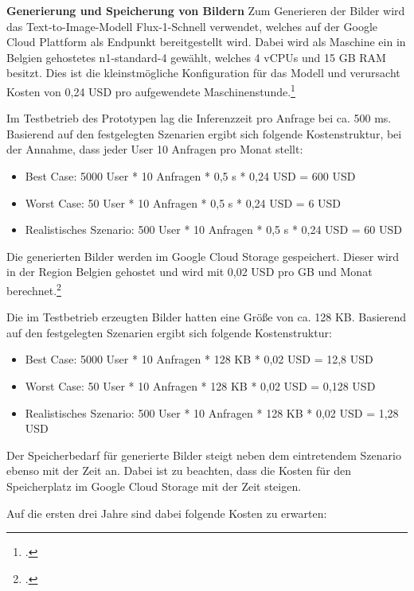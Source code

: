 \textbf{Generierung und Speicherung von Bildern}\newline
Zum Generieren der Bilder wird das Text-to-Image-Modell Flux-1-Schnell verwendet, welches auf der Google Cloud Plattform als Endpunkt bereitgestellt wird.
Dabei wird als Maschine ein in Belgien gehostetes n1-standard-4 gewählt, welches 4 vCPUs und 15 GB RAM besitzt.
Dies ist die kleinstmögliche Konfiguration für das Modell und verursacht Kosten von 0,24 USD pro aufgewendete Maschinenstunde.\footcite{GoogleVertexAI2025}

Im Testbetrieb des Prototypen lag die Inferenzzeit pro Anfrage bei ca. 500 ms.
Basierend auf den festgelegten Szenarien ergibt sich folgende Kostenstruktur, bei der Annahme, dass jeder User 10 Anfragen pro Monat stellt:

\begin{itemize}
    \item Best Case: 5000 User * 10 Anfragen * 0,5 s * 0,24 USD = 600 USD
    \item Worst Case: 50 User * 10 Anfragen * 0,5 s * 0,24 USD = 6 USD
    \item Realistisches Szenario: 500 User * 10 Anfragen * 0,5 s * 0,24 USD = 60 USD
\end{itemize}

Die generierten Bilder werden im Google Cloud Storage gespeichert.
Dieser wird in der Region Belgien gehostet und wird mit 0,02 USD pro GB und Monat berechnet.\footcite{GoogleCloudStorage2025}

Die im Testbetrieb erzeugten Bilder hatten eine Größe von ca. 128 KB.
Basierend auf den festgelegten Szenarien ergibt sich folgende Kostenstruktur:
\begin{itemize}
    \item Best Case: 5000 User * 10 Anfragen * 128 KB * 0,02 USD = 12,8 USD
    \item Worst Case: 50 User * 10 Anfragen * 128 KB * 0,02 USD = 0,128 USD
    \item Realistisches Szenario: 500 User * 10 Anfragen * 128 KB * 0,02 USD = 1,28 USD
\end{itemize}

Der Speicherbedarf für generierte Bilder steigt neben dem eintretendem Szenario ebenso mit der Zeit an.
Dabei ist zu beachten, dass die Kosten für den Speicherplatz im Google Cloud Storage mit der Zeit steigen.

Auf die ersten drei Jahre sind dabei folgende Kosten zu erwarten:

